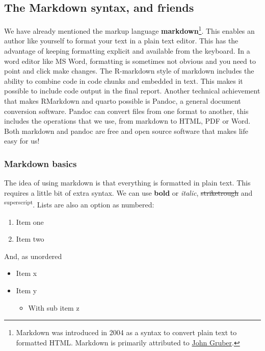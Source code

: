 \documentclass[
  11pt,
  letterpaper,
]{scrbook}
\providecommand{\tightlist}{%
  \setlength{\itemsep}{0pt}\setlength{\parskip}{0pt}}\usepackage{longtable,booktabs,array}
\begin{document}
\hypertarget{the-markdown-syntax-and-friends}{%
\subsection{The Markdown syntax, and
friends}\label{the-markdown-syntax-and-friends}}

We have already mentioned the markup language
\textbf{markdown}\footnote{Markdown was introduced in 2004 as a syntax
  to convert plain text to formatted HTML. Markdown is primarily
  attributed to
  \href{https://daringfireball.net/projects/markdown/}{John Gruber}.}.
This enables an author like yourself to format your text in a plain text
editor. This has the advantage of keeping formatting explicit and
available from the keyboard. In a word editor like MS Word, formatting
is sometimes not obvious and you need to point and click make changes.
The R-markdown style of markdown includes the ability to combine code in
code chunks and embedded in text. This makes it possible to include code
output in the final report. Another technical achievement that makes
RMarkdown and quarto possible is Pandoc, a general document conversion
software. Pandoc can convert files from one format to another, this
includes the operations that we use, from markdown to HTML, PDF or Word.
Both markdown and pandoc are free and open source software that makes
life easy for us!

\hypertarget{markdown-basics}{%
\subsubsection{Markdown basics}\label{markdown-basics}}

The idea of using markdown is that everything is formatted in plain
text. This requires a little bit of extra syntax. We can use
\textbf{bold} or \emph{italic}, \st{striketrough} and
\textsuperscript{superscript}. Lists are also an option as numbered:

\begin{enumerate}
\def\labelenumi{\arabic{enumi}.}
\tightlist
\item
  Item one
\item
  Item two
\end{enumerate}

And, as unordered

\begin{itemize}
\tightlist
\item
  Item x
\item
  Item y

  \begin{itemize}
  \tightlist
  \item
    With sub item z
  \end{itemize}
\end{itemize}
\end{document}
